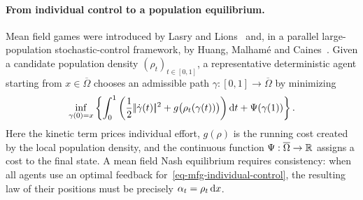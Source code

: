 \paragraph{From individual control to a population equilibrium.}
Mean field games were introduced by Lasry and Lions~\cite{LasryLions2007MeanFieldGames} and, in a parallel large-population stochastic-control framework, by Huang, Malham\'e and Caines~\cite{HuangMalhameCaines2006}. Given a candidate population density $(\rho_t)_{t\in[0,1]}$, a representative deterministic agent starting from $x\in\overline\Omega$ chooses an admissible path $\gamma:[0,1]\to\overline\Omega$ by minimizing
\begin{equation}\label{eq-mfg-individual-control}
	\inf_{\gamma(0)=x}
	\left\{
		\int_0^1
		\left(
			\frac12|\!| \dot\gamma(t) |\!|^2
			+g\bigl(\rho_t(\gamma(t))\bigr)
		\right)\mathrm{d} t
		+\Psi(\gamma(1))
	\right\}.
\end{equation}
Here the kinetic term prices individual effort, $g(\rho)$ is the running cost created by the local population density, and the continuous function $\Psi:\overline\Omega\to\mathbb{R}$ assigns a cost to the final state. A mean field Nash equilibrium requires consistency: when all agents use an optimal feedback for~\eqref{eq-mfg-individual-control}, the resulting law of their positions must be precisely $\alpha_t=\rho_t\,\mathrm{d} x$.

